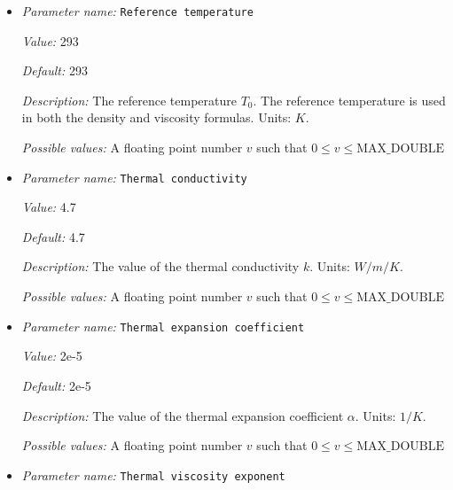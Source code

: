 \begin{itemize}
{\it Possible values:} A floating point number $v$ such that $0 \leq v \leq \text{MAX\_DOUBLE}$
\item {\it Parameter name:} {\tt Reference temperature}
\label{parameters:Material model/Simple model/Reference temperature}
\label{parameters:Material_20model/Simple_20model/Reference_20temperature}


{\it Value:} 293


{\it Default:} 293


{\it Description:} The reference temperature $T_0$. The reference temperature is used in both the density and viscosity formulas. Units: $K$.


{\it Possible values:} A floating point number $v$ such that $0 \leq v \leq \text{MAX\_DOUBLE}$
\item {\it Parameter name:} {\tt Thermal conductivity}
\label{parameters:Material model/Simple model/Thermal conductivity}
\label{parameters:Material_20model/Simple_20model/Thermal_20conductivity}


{\it Value:} 4.7


{\it Default:} 4.7


{\it Description:} The value of the thermal conductivity $k$. Units: $W/m/K$.


{\it Possible values:} A floating point number $v$ such that $0 \leq v \leq \text{MAX\_DOUBLE}$
\item {\it Parameter name:} {\tt Thermal expansion coefficient}
\label{parameters:Material model/Simple model/Thermal expansion coefficient}
\label{parameters:Material_20model/Simple_20model/Thermal_20expansion_20coefficient}


{\it Value:} 2e-5


{\it Default:} 2e-5


{\it Description:} The value of the thermal expansion coefficient $\alpha$. Units: $1/K$.


{\it Possible values:} A floating point number $v$ such that $0 \leq v \leq \text{MAX\_DOUBLE}$
\item {\it Parameter name:} {\tt Thermal viscosity exponent}
\label{parameters:Material model/Simple model/Thermal viscosity exponent}
\label{parameters:Material_20model/Simple_20model/Thermal_20viscosity_20exponent}



\end{itemize}
